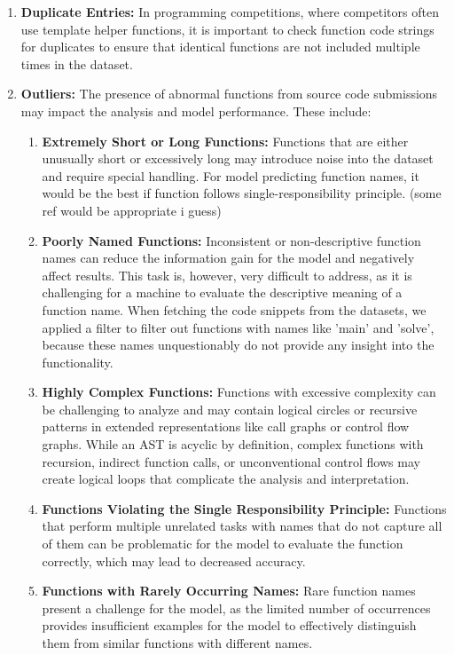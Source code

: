 \documentclass[10pt,english,a4paper]{report}
\begin{document}
\begin{enumerate}
    \item \textbf{Duplicate Entries:}
    \label{item:duplicate_entries}
    In programming competitions, where competitors often use template
    helper functions, it is important to check function code strings
    for duplicates to ensure that identical functions are not included
    multiple times in the dataset.

    \item \textbf{Outliers:}
    \label{item:outliers}
    The presence of abnormal functions from source code submissions may impact the analysis and model performance. These include:
    \begin{enumerate}
        \item \textbf{Extremely Short or Long Functions:}
        \label{item:short_long_functions}
        Functions that are either unusually short or excessively long may introduce noise into the dataset and require special handling. For model predicting function names, it would be the best if function follows single-responsibility principle. (some ref would be appropriate i guess)
       
        \item \textbf{Poorly Named Functions:}
        \label{item:poorly_named_functions}
        Inconsistent or non-descriptive function names can reduce the information gain for the model and negatively affect results. This task is, however, very difficult to address, as it is challenging for a machine to evaluate the descriptive meaning of a function name. When fetching the code snippets from the datasets, we applied a filter to filter out functions with names like 'main' and 'solve', because these names unquestionably do not provide any insight into the functionality.

        \item \textbf{Highly Complex Functions:}
        \label{item:complex_functions}
        Functions with excessive complexity can be challenging to analyze and may contain logical circles or recursive patterns in extended representations like call graphs or control flow graphs. While an AST is acyclic by definition, complex functions with recursion, indirect function calls, or unconventional control flows may create logical loops that complicate the analysis and interpretation.

        \item \textbf{Functions Violating the Single Responsibility Principle:}
        \label{item:single_responsibility}
        Functions that perform multiple unrelated tasks with names that do not capture all of them can be problematic for the model to evaluate the function correctly, which may lead to decreased accuracy.

        \item \textbf{Functions with Rarely Occurring Names:}
        \label{item:rare_names}
        Rare function names present a challenge for the model, as the limited number of occurrences provides insufficient examples for the model to effectively distinguish them from similar functions with different names.
    \end{enumerate}
\end{enumerate}
\end{document}
